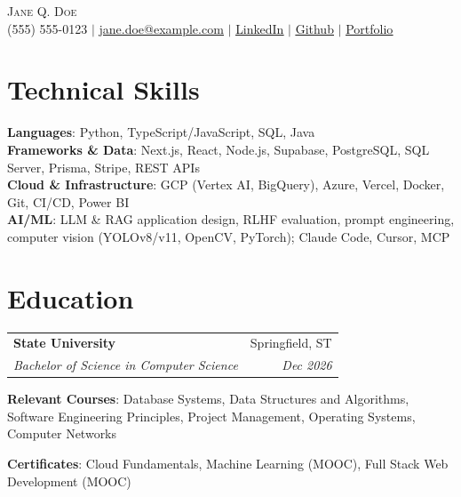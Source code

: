 \documentclass[letterpaper,11pt]{article}
\makeatletter
\newcommand{\resumeSubheading}[4]{
  \vspace{-2pt}
    \begin{tabular*}{0.97\textwidth}[t]{l@{\extracolsep{\fill}}r}
      \textcolor{myblue}{\textbf{#1}} & \textcolor{myblue}{#2} \\
      \textit{\small#3} & \textit{\small #4} \\
    \end{tabular*}\vspace{-7pt}
}
\newcommand{\resumeSubHeadingListStart}{\begin{itemize}[leftmargin=0.15in, label={}]}
\newcommand{\resumeSubHeadingListEnd}{\end{itemize}}
\makeatother
\begin{document}
\begin{center}
    {\Huge \scshape \textcolor{myblue}{Jane Q. Doe}} \\ \vspace{1pt}
    \small (555) 555-0123 $|$ \href{mailto:jane.doe@example.edu}{\underline{jane.doe@example.com}} $|$ 
    \href{https://www.example.com/in/jane-doe/}{\underline{LinkedIn}} $|$
    \href{https://example.com/janedoe}{\underline{Github}} $|$
    \href{https://janedoe.example.com/}{\underline{Portfolio}}
\end{center}


\section{Technical Skills}
\begin{itemize}[leftmargin=0.15in, label={}]
  \small{\item{
    \textbf{Languages}{: Python, TypeScript/JavaScript, SQL, Java} \\
    \textbf{Frameworks \& Data}{: Next.js, React, Node.js, Supabase, PostgreSQL, SQL Server, Prisma, Stripe, REST APIs} \\
    \textbf{Cloud \& Infrastructure}{: GCP (Vertex AI, BigQuery), Azure, Vercel, Docker, Git, CI/CD, Power BI} \\
    \textbf{AI/ML}{: LLM \& RAG application design, RLHF evaluation, prompt engineering, computer vision (YOLOv8/v11, OpenCV, PyTorch); Claude Code, Cursor, MCP}
  }}
\end{itemize}

\section{Education}
  \resumeSubHeadingListStart
    \item \resumeSubheading %
      {State University}{Springfield, ST}
      {Bachelor of Science in Computer Science}{Dec 2026}
      \begin{itemize}[leftmargin=0.15in, label={}]
        \small{\item{
          \textbf{Relevant Courses}{: Database Systems, Data Structures and Algorithms, Software Engineering Principles, Project Management, Operating Systems, Computer Networks}
        }}
      \end{itemize}
      \small{\item{
        \textbf{Certificates}{: Cloud Fundamentals, Machine Learning (MOOC), Full Stack Web Development (MOOC)}
      }}
  \resumeSubHeadingListEnd
\end{document}
